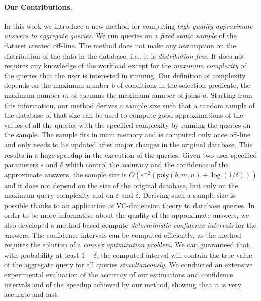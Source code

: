\paragraph{Our Contributions.} In this work we introduce a new method for
computing \emph{high-quality approximate answers to aggregate queries}. We run
queries on a \emph{fixed static sample} of the dataset created off-line. The
method does not make any assumption on the distribution of the data in the
database, i.e., it is \emph{distribution-free}. It does not requires any
knowledge of the workload except for the
\emph{maximum complexity} of the queries that the user is interested in running. Our
definition of complexity depends on the maximum number $b$ of conditions in
the selection predicate, the maximum number $m$ of columns the maximum number of
joins $u$. Starting from this information, our method derives a sample size
such that a random sample of the database of that size can be used to compute good
approximations of the values of all the queries with the specified complexity by
running the queries on the sample. The sample fits in main memory and is computed only once off-line and only
needs to be updated after major changes in the original database. This results
in a huge speedup in the execution of the queries. Given two user-specified
parameters $\varepsilon$ and $\delta$ which control the
accuracy and the confidence of the approximate answers, the sample size is
$O(\varepsilon^{-2}(\mathsf{poly}(b,m,u)+\log(1/\delta)))$ and it does not depend
on the size of the original database, but only on the maximum query complexity
and on $\varepsilon$ and $\delta$. Deriving such a sample size is possible thanks to an
application of VC-dimension theory to database queries. In order to be more
informative about the quality of the approximate answers, we also developed a
method based compute \emph{deterministic confidence intervals} for the answers.
The confidence intervals can be computed efficiently, as the method requires the
solution of a \emph{convex optimization problem}. We can guaranteed that, with
probability at least $1-\delta$, the computed interval will contain the true
value of the aggregate query for all queries \emph{simultaneously}. We conducted
an extensive experimental evaluation of the accuracy of our estimations and
confidence intervals and of the speedup achieved by our method, showing that it
is very accurate and fast.


